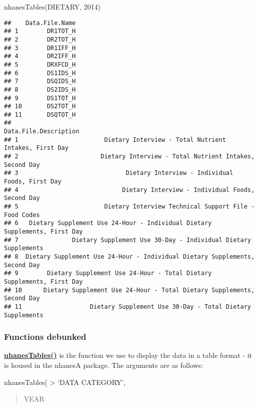 \documentclass[
]{book}
\newenvironment{Shaded}{\begin{snugshade}}{\end{snugshade}}
\newcommand{\DecValTok}[1]{\textcolor[rgb]{0.00,0.00,0.81}{#1}}
\newcommand{\FunctionTok}[1]{\textcolor[rgb]{0.00,0.00,0.00}{#1}}
\newcommand{\NormalTok}[1]{#1}
\newcommand{\StringTok}[1]{\textcolor[rgb]{0.31,0.60,0.02}{#1}}
\begin{document}
\begin{Shaded}
\begin{Highlighting}[]
\FunctionTok{nhanesTables}\NormalTok{(}\StringTok{\textquotesingle{}DIETARY\textquotesingle{}}\NormalTok{, }\DecValTok{2014}\NormalTok{)}
\end{Highlighting}
\end{Shaded}

\begin{verbatim}
##    Data.File.Name
## 1        DR1TOT_H
## 2        DR2TOT_H
## 3        DR1IFF_H
## 4        DR2IFF_H
## 5        DRXFCD_H
## 6        DS1IDS_H
## 7        DSQIDS_H
## 8        DS2IDS_H
## 9        DS1TOT_H
## 10       DS2TOT_H
## 11       DSQTOT_H
##                                                          Data.File.Description
## 1                        Dietary Interview - Total Nutrient Intakes, First Day
## 2                       Dietary Interview - Total Nutrient Intakes, Second Day
## 3                              Dietary Interview - Individual Foods, First Day
## 4                             Dietary Interview - Individual Foods, Second Day
## 5                        Dietary Interview Technical Support File - Food Codes
## 6   Dietary Supplement Use 24-Hour - Individual Dietary Supplements, First Day
## 7               Dietary Supplement Use 30-Day - Individual Dietary Supplements
## 8  Dietary Supplement Use 24-Hour - Individual Dietary Supplements, Second Day
## 9        Dietary Supplement Use 24-Hour - Total Dietary Supplements, First Day
## 10      Dietary Supplement Use 24-Hour - Total Dietary Supplements, Second Day
## 11                   Dietary Supplement Use 30-Day - Total Dietary Supplements
\end{verbatim}

\hypertarget{functions-debunked-7}{%
\subsubsection{Functions debunked}\label{functions-debunked-7}}

\href{https://www.rdocumentation.org/packages/nhanesA/versions/0.6.5.3/topics/nhanesTables}{\textbf{nhanesTables()}} is the function we use to display the data in a table format - it is housed in the nhanesA package. The arguments are as follows:

nhanesTables(
\textgreater{} `DATA CATEGORY',

\begin{quote}
YEAR
\end{quote}
\end{document}
